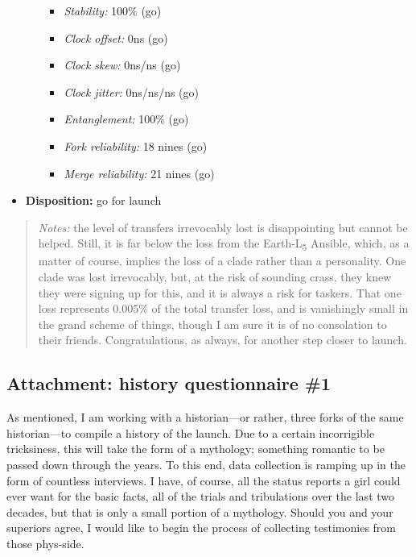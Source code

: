 \begin{itemize}
\begin{itemize}
    \begin{itemize}
    \tightlist
    \item
      \emph{Stability:} 100\% (go)
    \item
      \emph{Clock offset:} 0ns (go)
    \item
      \emph{Clock skew:} 0ns/ns (go)
    \item
      \emph{Clock jitter:} 0ns/ns/ns (go)
    \item
      \emph{Entanglement:} 100\% (go)
    \item
      \emph{Fork reliability:} 18 nines (go)
    \item
      \emph{Merge reliability:} 21 nines (go)
    \end{itemize}
  \end{itemize}
\item
  \textbf{Disposition:} go for launch
\end{itemize}

\begin{quote}
\emph{Notes:} the level of transfers irrevocably lost is disappointing but cannot be helped. Still, it is far below the loss from the Earth-L\textsubscript{5} Ansible, which, as a matter of course, implies the loss of a clade rather than a personality. One clade was lost irrevocably, but, at the risk of sounding crass, they knew they were signing up for this, and it is always a risk for taskers. That one loss represents 0.005\% of the total transfer loss, and is vanishingly small in the grand scheme of things, though I am sure it is of no consolation to their friends. Congratulations, as always, for another step closer to launch.
\end{quote}

\hypertarget{attachment-history-questionnaire-1}{%
\subsection*{Attachment: history questionnaire \#1}\label{attachment-history-questionnaire-1}}

As mentioned, I am working with a historian---or rather, three forks of the same historian---to compile a history of the launch. Due to a certain incorrigible tricksiness, this will take the form of a mythology; something romantic to be passed down through the years. To this end, data collection is ramping up in the form of countless interviews. I have, of course, all the status reports a girl could ever want for the basic facts, all of the trials and tribulations over the last two decades, but that is only a small portion of a mythology. Should you and your superiors agree, I would like to begin the process of collecting testimonies from those phys-side.

